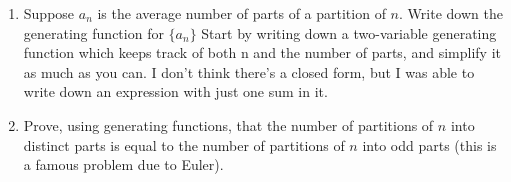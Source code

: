 \documentclass[12pt]{article}
\begin{document}
\begin{enumerate}
	\item Suppose $a_n$ is the average number of parts of a partition of $n$.  Write down the generating function for $\{a_n\}$ Start by writing down a two-variable generating function which keeps track of both n and the number of parts, and simplify it as much as you can. I don't think there's a closed form, but I was able to write down an expression with just one sum in it.
	\item Prove, using generating functions, that the number of partitions of $n$ into distinct parts is equal to the number of partitions of $n$ into odd parts (this is a famous problem due to Euler).
\end{enumerate}
\end{document}
